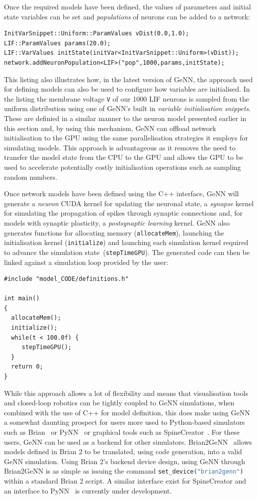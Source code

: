 \documentclass[utf8]{frontiersSCNS} %
\begin{document}
Once the required models have been defined, the values of parameters and initial state variables can be set and \textit{populations} of neurons can be added to a network:
%
\begin{lstlisting}
InitVarSnippet::Uniform::ParamValues vDist(0.0,1.0);
LIF::ParamValues params(20.0);
LIF::VarValues initState(initVar<InitVarSnippet::Uniform>(vDist));
network.addNeuronPopulation<LIF>("pop",1000,params,initState);
\end{lstlisting}
%
This listing also illustrates how, in the latest version of GeNN, the approach used for defining models can also be used to configure how variables are initialised.
In the listing the membrane voltage \lstinline{V} of our \num{1000} LIF neurons is sampled from the uniform distribution using one of GeNN's built in \textit{variable initialisation snippets}.
These are definied in a similar manner to the neuron model presented earlier in this section and, by using this mechanism, GeNN can offload network initialisation to the GPU using the same parallelisation strategies it employs for simulating models.
This approach is advantageous as it removes the need to transfer the model state from the CPU to the GPU and allows the GPU to be used to accelerate potentially costly initialisation operations such as sampling random numbers.

Once network models have been defined using the C++ interface, GeNN will generate a \textit{neuron} CUDA kernel for updating the neuronal state, a \textit{synapse} kernel for simulating the propagation of spikes through synaptic connections and, for models with synaptic plasticity, a \textit{postsynaptic learning} kernel. 
GeNN also generates functions for allocating memory (\lstinline{allocateMem}), launching the initialisation kernel (\lstinline{initialize}) and launching each simulation kernel required to advance the simulation state~(\lstinline{stepTimeGPU}).
The generated code can then be linked against a simulation loop provided by the user:
%
\begin{lstlisting}
#include "model_CODE/definitions.h"

int main()
{
  allocateMem();
  initialize();
  while(t < 100.0f) {
     stepTimeGPU();
  }
  return 0;
}
\end{lstlisting}
%
While this approach allows a lot of flexibility and means that visualisation tools and closed-loop robotics can be tightly coupled to GeNN simulations, when combined with the use of C++ for model definition, this does make using GeNN a somewhat daunting prospect for users more used to Python-based simulators such as Brian~\citep{Stimberg2014} or PyNN~\citep{Davison2008a} or graphical tools such as SpineCreator~\citep{Cope2017}.
For these users, GeNN can be used as a backend for other simulators.
Brian2GeNN~\citep{Stimberg2018} allows models defined in Brian 2 to be translated, using code generation, into a valid GeNN simulation. 
Using Brian 2's backend device design, using GeNN through Brian2GeNN is as simple as issuing the command \lstinline[language=python]{set_device("brian2genn")} within a standard Brian 2 script. 
A similar interface exist for SpineCreator and an interface to PyNN~\citep{Davison2008a} is currently under development.
 
\end{document}
